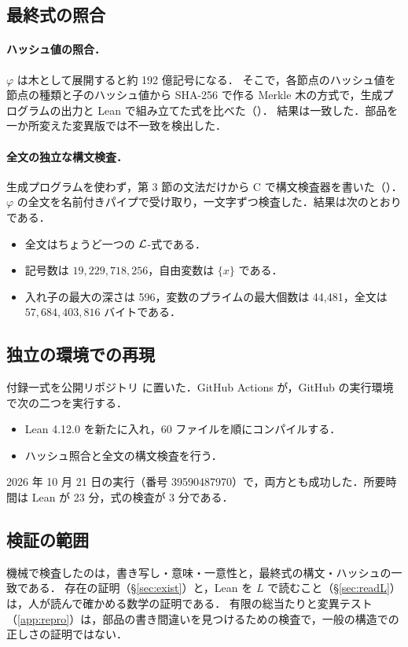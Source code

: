 \subsection{最終式の照合}
\paragraph{ハッシュ値の照合．}$\varphi$ は木として展開すると約 192 億記号になる．
そこで，各節点のハッシュ値を節点の種類と子のハッシュ値から SHA-256 で作る Merkle 木の方式で，生成プログラムの出力と Lean で組み立てた式を比べた（）．
結果は一致した．部品を一か所変えた変異版では不一致を検出した．

\paragraph{全文の独立な構文検査．}生成プログラムを使わず，第 3 節の文法だけから C で構文検査器を書いた（）．
$\varphi$ の全文を名前付きパイプで受け取り，一文字ずつ検査した．結果は次のとおりである．
\begin{itemize}
\item 全文はちょうど一つの $\mathcal{L}$-式である．
\item 記号数は $19{,}229{,}718{,}256$，自由変数は $\{x\}$ である．
\item 入れ子の最大の深さは 596，変数のプライムの最大個数は 44{,}481，全文は $57{,}684{,}403{,}816$ バイトである．
\end{itemize}

\subsection{独立の環境での再現}
付録一式を公開リポジトリ \cite{repo} に置いた．GitHub Actions が，GitHub の実行環境で次の二つを実行する．
\begin{itemize}
\item Lean 4.12.0 を新たに入れ，60 ファイルを順にコンパイルする．
\item ハッシュ照合と全文の構文検査を行う．
\end{itemize}
2026 年 10 月 21 日の実行（番号 39590487970）で，両方とも成功した．所要時間は Lean が 23 分，式の検査が 3 分である．

\subsection{検証の範囲}
機械で検査したのは，書き写し・意味・一意性と，最終式の構文・ハッシュの一致である．
存在の証明（\S\ref{sec:exist}）と，Lean を $L$ で読むこと（\S\ref{sec:readL}）は，人が読んで確かめる数学の証明である．
有限の総当たりと変異テスト（\ref{app:repro}）は，部品の書き間違いを見つけるための検査で，一般の構造での正しさの証明ではない．
